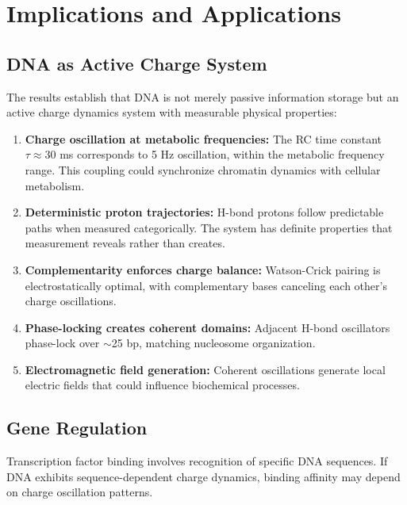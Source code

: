 \documentclass[twocolumn,10pt]{article}
\theoremstyle{remark}
\begin{document}
\section{Implications and Applications}

\subsection{DNA as Active Charge System}

The results establish that DNA is not merely passive information storage but an active charge dynamics system with measurable physical properties:

\begin{enumerate}
\item \textbf{Charge oscillation at metabolic frequencies:} The RC time constant $\tau \approx 30$ ms corresponds to 5 Hz oscillation, within the metabolic frequency range. This coupling could synchronize chromatin dynamics with cellular metabolism.

\item \textbf{Deterministic proton trajectories:} H-bond protons follow predictable paths when measured categorically. The system has definite properties that measurement reveals rather than creates.

\item \textbf{Complementarity enforces charge balance:} Watson-Crick pairing is electrostatically optimal, with complementary bases canceling each other's charge oscillations.

\item \textbf{Phase-locking creates coherent domains:} Adjacent H-bond oscillators phase-lock over $\sim$25 bp, matching nucleosome organization.

\item \textbf{Electromagnetic field generation:} Coherent oscillations generate local electric fields that could influence biochemical processes.
\end{enumerate}

\subsection{Gene Regulation}

Transcription factor binding involves recognition of specific DNA sequences. If DNA exhibits sequence-dependent charge dynamics, binding affinity may depend on charge oscillation patterns.
\end{document}
